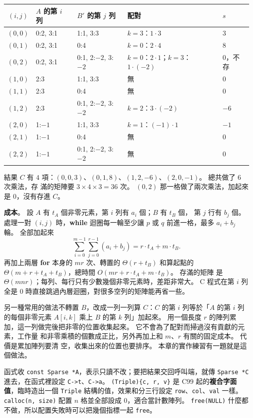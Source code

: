 \begin{center}
\begin{tabular}{cllll}
\toprule
$(i, j)$ & $A$ 的第 $i$ 列 & $B'$ 的第 $j$ 列 & 配對 & $s$ \\
\midrule
$(0, 0)$ & 0:2, 3:1 & 1:1, 3:3 & $k = 3$：$1 \cdot 3$ & $3$ \\
$(0, 1)$ & 0:2, 3:1 & 0:4 & $k = 0$：$2 \cdot 4$ & $8$ \\
$(0, 2)$ & 0:2, 3:1 & 0:1, 2:$-2$, 3:$-2$ & $k = 0$：$2 \cdot 1$；$k = 3$：$1 \cdot (-2)$ & $0$，不存 \\
$(1, 0)$ & 2:3 & 1:1, 3:3 & 無 & $0$ \\
$(1, 1)$ & 2:3 & 0:4 & 無 & $0$ \\
$(1, 2)$ & 2:3 & 0:1, 2:$-2$, 3:$-2$ & $k = 2$：$3 \cdot (-2)$ & $-6$ \\
$(2, 0)$ & 1:$-1$ & 1:1, 3:3 & $k = 1$：$(-1) \cdot 1$ & $-1$ \\
$(2, 1)$ & 1:$-1$ & 0:4 & 無 & $0$ \\
$(2, 2)$ & 1:$-1$ & 0:1, 2:$-2$, 3:$-2$ & 無 & $0$ \\
\bottomrule
\end{tabular}
\end{center}

結果 $C$ 有 $4$ 項：$(0,0,3)$、$(0,1,8)$、$(1,2,-6)$、$(2,0,-1)$。 總共做了 $6$ 次乘法，存
滿的矩陣要 $3 \times 4 \times 3 = 36$ 次。 $(0, 2)$ 那一格做了兩次乘法，加起來是
$0$，沒有存進 $C$。

\textbf{成本}。 設 $A$ 有 $t_A$ 個非零元素，第 $i$ 列有 $a_i$ 個；$B$ 有 $t_B$ 個，
第 $j$ 行有 $b_j$ 個。 處理一對 $(i, j)$ 時，\textbf{while} 迴圈每一輪至少讓 $p$ 或
$q$ 前進一格，最多 $a_i + b_j$ 輪。 全部加起來
\[
\sum_{i=0}^{m-1} \sum_{j=0}^{r-1} (a_i + b_j) = r \cdot t_A + m \cdot t_B .
\]
再加上兩層 \textbf{for} 本身的 $mr$ 次、轉置的 $\Theta(r + t_B)$ 和算起點的
$\Theta(m + r + t_A + t_B)$，總時間 $O(mr + r \cdot t_A + m \cdot t_B)$。 存滿的矩陣
是 $\Theta(mnr)$；每列、每行只有少數幾個非零元素時，差距非常大。 C 程式在第 $i$ 列
全是 $0$ 時直接跳過內層迴圈，對很多空列的矩陣能再省一些。

另一種常用的做法不轉置 $B$，改成一列一列算 $C$：$C$ 的第 $i$ 列等於「$A$ 的第 $i$
列的每個非零元素 $A[i, k]$ 乘上 $B$ 的第 $k$ 列」加起來。 用一個長度 $r$ 的陣列累
加，這一列做完後把非零的位置收集起來。 它不會為了配對而掃過沒有貢獻的元素，工作量
和非零乘積的個數成正比，另外再加上和 $m$、$r$ 有關的固定成本。 代價是累加陣列要清
空，收集出來的位置也要排序。 本章的實作練習有一題就是這個做法。

\begin{cbookrecap}[第~9~章 9.3 節、第~14~章 14.3、14.5、14.6 節、第~19~章 19.3 節]
函式收 \texttt{const Sparse *A}，表示只讀不改；要把結果交回呼叫端，就傳
\texttt{Sparse *C} 進去，在函式裡設定 \texttt{C->t}、\texttt{C->a}。
\texttt{(Triple)\{c, r, v\}} 是 C99 起的\textbf{複合字面值}，臨時造出一個
\texttt{Triple} 結構的值，效果和分三行設定 \texttt{row}、\texttt{col}、\texttt{val}
一樣。 \texttt{calloc(n, size)} 配置 $n$ 格並全部設成 $0$，適合當計數陣列。
\texttt{free(NULL)} 什麼都不做，所以配置失敗時可以把幾個指標一起 \texttt{free}。
\end{cbookrecap}

